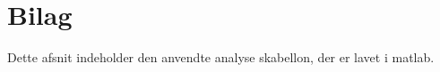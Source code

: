 \chapter{Bilag}\label{ch:Bilag}

Dette afsnit indeholder den anvendte analyse skabellon, der er lavet i matlab.



